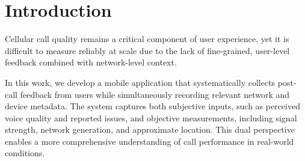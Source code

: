 \documentclass{article}
\theoremstyle{plain}
\theoremstyle{definition}
\theoremstyle{remark}
\begin{document}




\begin{abstract}
We present a mobile system for collecting and analyzing user-reported feedback on cellular call quality. The system integrates an Android-based client that captures post-call subjective feedback alongside automatically collected network metadata, including signal strength, network type, and location. This combined dataset enables large-scale analysis of call performance across carriers and environments. By correlating user experience with objective network conditions, our framework provides a foundation for identifying patterns in call quality and supports data-driven evaluation of cellular network performance. The source code is available at \url{https://github.com/gkonethree/CallFeedbackApp}
\end{abstract}


\section{Introduction}

Cellular call quality remains a critical component of user experience, yet it is difficult to measure reliably at scale due to the lack of fine-grained, user-level feedback combined with network-level context. 

In this work, we develop a mobile application that systematically collects post-call feedback from users while simultaneously recording relevant network and device metadata. The system captures both subjective inputs, such as perceived voice quality and reported issues, and objective measurements, including signal strength, network generation, and approximate location. This dual perspective enables a more comprehensive understanding of call performance in real-world conditions.
\end{document}
